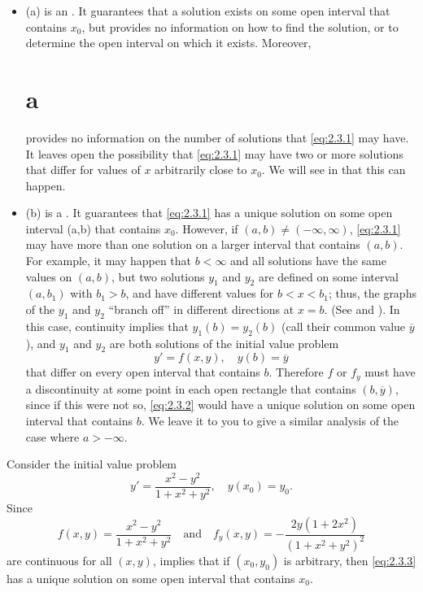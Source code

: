 \begin{itemize}
\item (a) is an . It guarantees that a
solution exists on some open interval that contains $x_0$, but provides
no information on how to find the solution, or to determine the open
interval on which it exists. Moreover, \part{a} provides no
information on the number of solutions that \eqref{eq:2.3.1} may have. It
leaves open the possibility that \eqref{eq:2.3.1} may have two or more
solutions that differ for values of $x$ arbitrarily close to $x_0$. We
will see in  that this can happen.

\item (b) is a . It guarantees that
\eqref{eq:2.3.1} has a unique solution on some open interval (a,b) that
contains $x_0$. However, if $(a,b)\ne(-\infty,\infty)$,
\eqref{eq:2.3.1} may have more than one solution on a larger interval
that contains $(a,b)$. For example, it may happen that $b<\infty$ and all
solutions have the same values on $(a,b)$, but two solutions $y_1$ and
$y_2$ are defined on some interval $(a,b_1)$ with $b_1>b$, and have
different values for $b<x<b_1$;   thus, the graphs of the $y_1$ and
$y_2$ ``branch off'' in different directions at $x=b$. (See
 and ). In this case,
continuity implies that $y_1(b)=y_2(b)$ (call their common value
$\overline y$), and  $y_1$ and $y_2$ are both solutions of the initial
value problem
\begin{equation} \label{eq:2.3.2}
y'=f(x,y),\quad y(b)=\overline y
\end{equation}
that differ on every open interval that contains $b$. Therefore
$f$ or $f_y$ must have a discontinuity at some point in each open
rectangle that contains $(b,\overline y)$, since if this were not so,
\eqref{eq:2.3.2} would have a unique solution on some open interval
that contains $b$. We leave it to you to give a similar analysis of the
case where $a>-\infty$.
 \end{itemize}

\begin{example}\label{example:2.3.1}
Consider  the initial value problem
\begin{equation} \label{eq:2.3.3}
y'=\frac{x^2-y^2 }{1+x^2+y^2}, \quad y(x_0)=y_0.
\end{equation}
Since
\[
f(x,y)  = \frac{x^2-y^2 }{1+x^2+y^2}\quad\text{and}\quad 
f_y(x,y)  =  -\frac{2y(1+2x^2)}{(1+x^2+y^2)^2}
\]
are continuous for all $(x,y)$,  implies that
if $(x_0,y_0)$ is arbitrary, then
\eqref{eq:2.3.3} has a unique solution on some open interval that contains
$x_0$.
\end{example}


